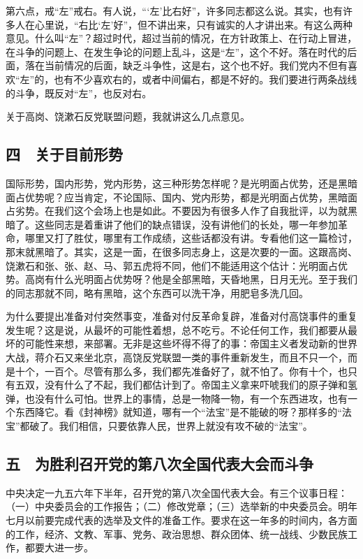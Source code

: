 第六点，戒“左”戒右。有人说，“‘左’比右好”，许多同志都这么说。其实，也有许多人在心里说，“右比‘左’好”，但不讲出来，只有诚实的人才讲出来。有这么两种意见。什么叫“左”？超过时代，超过当前的情况，在方针政策上、在行动上冒进，在斗争的问题上、在发生争论的问题上乱斗，这是“左”，这个不好。落在时代的后面，落在当前情况的后面，缺乏斗争性，这是右，这个也不好。我们党内不但有喜欢“左”的，也有不少喜欢右的，或者中间偏右，都是不好的。我们要进行两条战线的斗争，既反对“左”，也反对右。

关于高岗、饶漱石反党联盟问题，我就讲这么几点意见。

\subsection{四　关于目前形势}

国际形势，国内形势，党内形势，这三种形势怎样呢？是光明面占优势，还是黑暗面占优势呢？应当肯定，不论国际、国内、党内形势，都是光明面占优势，黑暗面占劣势。在我们这个会场上也是如此。不要因为有很多人作了自我批评，以为就黑暗了。这些同志是着重讲了他们的缺点错误，没有讲他们的长处，哪一年参加革命，哪里又打了胜仗，哪里有工作成绩，这些话都没有讲。专看他们这一篇检讨，那末就黑暗了。其实，这是一面，在很多同志身上，这是次要的一面。这跟高岗、饶漱石和张、张、赵、马、郭五虎将不同，他们不能适用这个估计：光明面占优势。高岗有什么光明面占优势呀？他是全部黑暗，天昏地黑，日月无光。至于我们的同志那就不同，略有黑暗，这个东西可以洗干净，用肥皂多洗几回。

为什么要提出准备对付突然事变，准备对付反革命复辟，准备对付高饶事件的重复发生呢？这是说，从最坏的可能性着想，总不吃亏。不论任何工作，我们都要从最坏的可能性来想，来部署。无非是这些坏得不得了的事：帝国主义者发动新的世界大战，蒋介石又来坐北京，高饶反党联盟一类的事件重新发生，而且不只一个，而是十个，一百个。尽管有那么多，我们都先准备好了，就不怕了。你有十个，也只有五双，没有什么了不起，我们都估计到了。帝国主义拿来吓唬我们的原子弹和氢弹，也没有什么可怕。世界上的事情，总是一物降一物，有一个东西进攻，也有一个东西降它。看《封神榜》就知道，哪有一个“法宝”是不能破的呀？那样多的“法宝”都破了。我们相信，只要依靠人民，世界上就没有攻不破的“法宝”。

\subsection{五　为胜利召开党的第八次全国代表大会而斗争}

中央决定一九五六年下半年，召开党的第八次全国代表大会。有三个议事日程：（一）中央委员会的工作报告；（二）修改党章；（三）选举新的中央委员会。明年七月以前要完成代表的选举及文件的准备工作。要求在这一年多的时间内，各方面的工作，经济、文教、军事、党务、政治思想、群众团体、统一战线、少数民族工作，都要大进一步。

